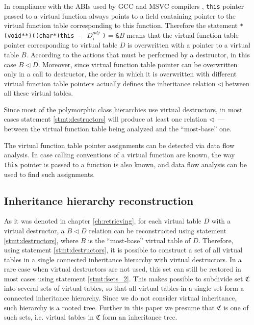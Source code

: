 \documentclass[times, 10pt,twocolumn]{article}
\newcommand{\gC}{\mathfrak{C}}
\newcommand{\adj}{\textit{adj}}
\begin{document}
In compliance with the ABIs used by GCC and MSVC compilers
\cite{gccabi, gray94}, \lstinline{this} pointer passed to a virtual function
always points to a field containing pointer
to the virtual function table corresponding to this function.
Therefore the statement \lstinline{*(void**)((char*)this - } $D_i^{\adj}$ \lstinline{)} = \lstinline{&}$B$ means
that the virtual function table pointer corresponding to virtual table $D$
is overwritten with a pointer to a virtual table $B$.
According to the actions that must be performed by a destructor,
in this case $B \lhd D$.
Moreover, since virtual function table pointer can be overwritten
only in a call to destructor,
the order in which it is overwritten with different
virtual function table pointers actually defines
the inheritance relation $\lhd$ between all these virtual tables.

Since most of the polymorphic class hierarchies use virtual destructors,
in most cases statement \ref{stmt:destructors} will produce
at least one relation $\lhd$~--- between the virtual function
table being analyzed and the ``most-base'' one.

The virtual function table pointer assignments can be detected
via data flow analysis.
In case calling conventions of a virtual function are known,
the way \lstinline{this} pointer is passed to a function is also known,
and data flow analysis can be used to find such assignments.

\subsection{Inheritance hierarchy reconstruction}
\label{chapter:problem}

As it was denoted in chapter \ref{ch:retrieving},
for each virtual table $D$ with a virtual destructor,
a $B \lhd D$ relation can be reconstructed using
statement \ref{stmt:destructors},
where $B$ is the ``most-base'' virtual table of $D$.
Therefore, using statement \ref{stmt:destructors},
it is possible to construct a set of all virtual tables
in a single connected inheritance hierarchy with virtual destructors.
In a rare case when virtual destructors are not used,
this set can still be restored in most cases using statement \ref{stmt:fsets_2}.
This makes possible to subdivide set $\gC$ into several sets of virtual tables,
so that all virtual tables in a single set
form a connected inheritance hierarchy.
Since we do not consider virtual inheritance, such hierarchy is a rooted tree.
Further in this paper we presume that $\gC$ is one of such sets,
i.e. virtual tables in $\gC$ form an inheritance tree.
\end{document}
